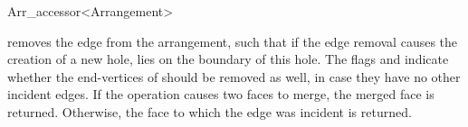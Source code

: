 \begin{ccRefClass}{Arr_accessor<Arrangement>}
\begin{ccAdvanced}
  {removes the edge  from the arrangement, such that if the edge removal causes
   the creation of a new hole,  lies on the boundary of this hole.
   The flags  and  indicate whether the end-vertices
   of  should be removed as well, in case they have no other incident edges.
   If the operation causes two faces to merge, the merged face is returned.
   Otherwise, the face to which the edge was incident is returned.}

\end{ccAdvanced}

\end{ccRefClass}

\ccRefPageEnd
